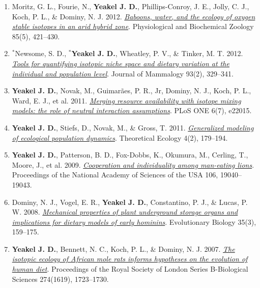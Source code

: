 \documentclass[margin,line,12pt]{res}
\begin{document}
\begin{resume}
\begin{enumerate}
\item Moritz, G. L., Fourie, N., \textbf{Yeakel J. D.}, Phillips-Conroy, J. E., Jolly, C. J., Koch, P. L., \& Dominy, N. J. 2012. \href{https://pubmed.ncbi.nlm.nih.gov/22902370/}{\emph{Baboons, water, and the ecology of oxygen stable isotopes in an arid hybrid zone}}. Physiological and Biochemical Zoology 85(5), 421–430.

\item ${}^\ast$Newsome, S. D., \textbf{${}^\ast$Yeakel J. D.}, Wheatley, P. V., \& Tinker, M. T. 2012. \href{https://academic.oup.com/jmammal/article/93/2/329/919625}{\emph{Tools for quantifying isotopic niche space and dietary variation at the individual and population level}}. Journal of Mammalogy 93(2), 329–341.

\item \textbf{Yeakel J. D.}, Novak, M., Guimar\~aes, P. R., Jr, Dominy, N. J., Koch, P. L., Ward, E. J., et al. 2011. \href{https://journals.plos.org/plosone/article?id=10.1371/journal.pone.0022015}{\emph{Merging resource availability with isotope mixing models: the role of neutral interaction assumptions}}. PLoS ONE 6(7), e22015.

\item \textbf{Yeakel J. D.}, Stiefs, D., Novak, M., \& Gross, T. 2011. \href{https://link.springer.com/article/10.1007/s12080-011-0112-6}{\emph{Generalized modeling of ecological population dynamics}}. Theoretical Ecology 4(2), 179–194.

\item \textbf{Yeakel J. D.}, Patterson, B. D., Fox-Dobbs, K., Okumura, M., Cerling, T., Moore, J., et al. 2009. \href{https://www.pnas.org/content/106/45/19040}{\emph{Cooperation and individuality among man-eating lions}}. Proceedings of the National Academy of Sciences of the USA 106, 19040–19043.

\item Dominy, N. J., Vogel, E. R., \textbf{Yeakel J. D.}, Constantino, P. J., \& Lucas, P. W. 2008. \href{https://link.springer.com/article/10.1007/s11692-008-9026-7}{\emph{Mechanical properties of plant underground storage organs and implications for dietary models of early hominins}}. Evolutionary Biology 35(3), 159–175.

\item \textbf{Yeakel J. D.}, Bennett, N. C., Koch, P. L., \& Dominy, N. J. 2007. \href{https://royalsocietypublishing.org/doi/10.1098/rspb.2007.0330}{\emph{The isotopic ecology of African mole rats informs hypotheses on the evolution of human diet}}. Proceedings of the Royal Society of London Series B-Biological Sciences 274(1619), 1723–1730.


\end{enumerate}
\end{resume}
\end{document}
